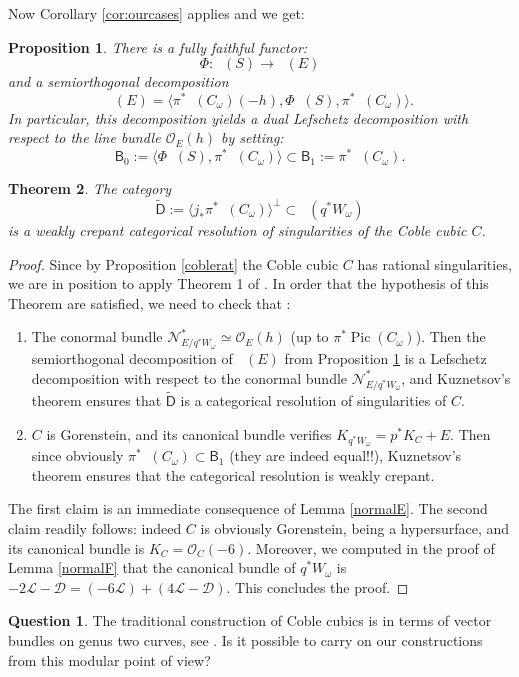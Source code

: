 \documentclass[11pt]{article}
\let\mathcal\mathscr
\theoremstyle{plain}
\newtheorem{theorem}{Theorem}\newtheorem*{theorem*}{Theorem}
\newtheorem{prop}[theorem]{Proposition}
\theoremstyle{definition}
\newtheorem*{question*}{Question}
\newcommand{\cat}[1]{\mathsf{#1}}
\newcommand{\sod}[1]{\langle #1 \rangle}
\DeclareMathOperator{\Db}{{\cat{D}^{\mathrm{b}}}}
\DeclareMathOperator{\Pic}{Pic}
\newcommand{\sheaf}[1]{\mathcal{#1}}
\newcommand{\kd}{\sheaf{D}}
\newcommand{\kl}{\sheaf{L}}
\newcommand{\kn}{\sheaf{N}}
\newcommand{\ko}{\sheaf{O}}\let\OO\ko\let\cO\ko
\begin{document}
Now Corollary \ref{cor:ourcases} applies and we get:

\begin{prop}\label{sodComega}
There is a fully faithful functor:
\[
\Phi: \Db(S) \to \Db(E)
\]
and a semiorthogonal decomposition
\[
\Db(E) = \sod{\pi^*\Db(C_\omega)(-h),\Phi\Db(S),\pi^* \Db(C_\omega)}.
\]
In particular, this decomposition yields a dual Lefschetz decomposition with respect to the line
bundle $\ko_E(h)$ by setting:
\[
\cat{B}_0:=\sod{\Phi\Db(S),\pi^*\Db(C_\omega)} \subset \cat{B}_{1}:=\pi^*\Db(C_\omega).
\]
\end{prop}

\begin{theorem}\label{weakly-crepant}
The category
\[
\tilde{\cat{D}}:= \sod{j_*\pi^* \Db(C_\omega)}^\perp \subset \Db(q^*W_\omega)
\]
is a weakly crepant categorical resolution of singularities of the Coble cubic $C$.
\end{theorem}

\begin{proof}
Since by Proposition \ref{coblerat} the Coble cubic $C$ has rational singularities, we are
in position to apply Theorem 1 of \cite{kuz-lefschetz}. In order that the hypothesis of
this Theorem are satisfied, we need to check that :
\begin{enumerate}
\item The conormal bundle $\kn_{E/q^* W_\omega}^*\simeq \ko_E(h)$
(up to $\pi^*\Pic(C_\omega)$). Then the semiorthogonal decomposition of $\Db(E)$ from Proposition \ref{sodComega} is a Lefschetz decomposition with respect to the conormal bundle $\kn_{E/q^*W_\omega}^*$, and Kuznetsov's theorem ensures
that $\tilde{\cat{D}}$ is a categorical resolution
of singularities of $C$.
\item $C$ is Gorenstein, and its canonical bundle verifies $K_{q^*W_\omega}=p^*K_C + E$. Then
since obviously $\pi^* \Db(C_\omega) \subset\cat{B}_1$ (they are indeed equal!!),
Kuznetsov's theorem ensures that the categorical resolution is weakly crepant.
\end{enumerate}
The first claim is an immediate consequence of Lemma \ref{normalE}.
The second claim readily follows: indeed
$C$ is obviously Gorenstein, being a hypersurface, and its
canonical bundle is $K_C=\ko_C(-6)$. Moreover, we computed in the proof of Lemma
\ref{normalF} that the canonical bundle of $q^*W_\omega$ is $-2\kl-\kd=(-6\kl)+(4\kl-\kd)$.
This concludes the proof.
\end{proof}

\begin{question*}
The traditional construction of Coble cubics is in terms of
vector bundles on genus two curves, see \cite{beauville-coble}. Is it possible to carry on our constructions
from this modular point of view?
\end{question*}
\end{document}
